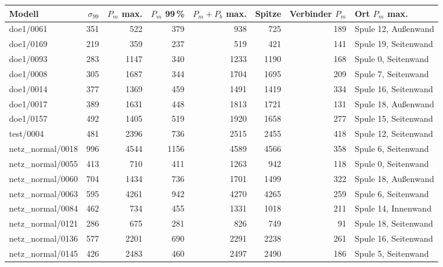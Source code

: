 \begin{tabular}{@{}lrrrrrrl@{}}\toprule
Modell & $\sigma_{99}$ & $P_m$ max. & $P_m$ 99\,\% & $P_m{+}P_b$ max. & Spitze & Verbinder $P_m$ & Ort $P_m$ max. \\\midrule
doe1/0061 & \num{351} & \num{522} & \num{379} & \num{938} & \num{725} & \num{189} & Spule 12, Außenwand \\
doe1/0169 & \num{219} & \num{359} & \num{237} & \num{519} & \num{421} & \num{141} & Spule 19, Seitenwand \\
doe1/0093 & \num{283} & \num{1147} & \num{340} & \num{1233} & \num{1190} & \num{168} & Spule 0, Seitenwand \\
doe1/0008 & \num{305} & \num{1687} & \num{344} & \num{1704} & \num{1695} & \num{209} & Spule 7, Seitenwand \\
doe1/0014 & \num{377} & \num{1369} & \num{459} & \num{1491} & \num{1419} & \num{334} & Spule 16, Seitenwand \\
doe1/0017 & \num{389} & \num{1631} & \num{448} & \num{1813} & \num{1721} & \num{131} & Spule 18, Außenwand \\
doe1/0157 & \num{492} & \num{1405} & \num{519} & \num{1920} & \num{1658} & \num{277} & Spule 15, Seitenwand \\
test/0004 & \num{481} & \num{2396} & \num{736} & \num{2515} & \num{2455} & \num{418} & Spule 12, Seitenwand \\
netz\_normal/0018 & \num{996} & \num{4544} & \num{1156} & \num{4589} & \num{4566} & \num{358} & Spule 6, Seitenwand \\
netz\_normal/0055 & \num{413} & \num{710} & \num{411} & \num{1263} & \num{942} & \num{118} & Spule 0, Seitenwand \\
netz\_normal/0060 & \num{704} & \num{1434} & \num{736} & \num{1701} & \num{1499} & \num{322} & Spule 18, Außenwand \\
netz\_normal/0063 & \num{595} & \num{4261} & \num{942} & \num{4270} & \num{4265} & \num{259} & Spule 6, Seitenwand \\
netz\_normal/0084 & \num{462} & \num{734} & \num{455} & \num{1331} & \num{1018} & \num{211} & Spule 14, Innenwand \\
netz\_normal/0121 & \num{286} & \num{675} & \num{281} & \num{826} & \num{749} & \num{91} & Spule 18, Seitenwand \\
netz\_normal/0136 & \num{577} & \num{2201} & \num{690} & \num{2291} & \num{2238} & \num{261} & Spule 16, Seitenwand \\
netz\_normal/0145 & \num{426} & \num{2483} & \num{460} & \num{2497} & \num{2490} & \num{186} & Spule 5, Seitenwand \\

\end{tabular}
